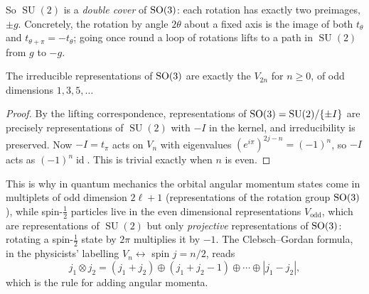 \documentclass[a4paper]{scrartcl}
\newcommand{\SU}{\operatorname{SU}}
\newcommand{\id}{\operatorname{id}}
\begin{document}
So $\SU(2)$ is a \emph{double cover} of $\operatorname{SO}(3)$: each rotation has exactly two preimages, $\pm g$. Concretely, the rotation by angle $2\theta$ about a fixed axis is the image of both $t_\theta$ and $t_{\theta+\pi} = -t_\theta$; going once round a loop of rotations lifts to a path in $\SU(2)$ from $g$ to $-g$.

\begin{center}
\end{center}
\vspace{0.3em}

\begin{corollary}
	The irreducible representations of $\operatorname{SO}(3)$ are exactly the $V_{2n}$ for $n\geq0$, of odd dimensions $1, 3, 5,\dots$
\end{corollary}
\begin{proof}
	By the lifting correspondence, representations of $\SO(3) = \SU(2)/\{\pm I\}$ are precisely representations of $\SU(2)$ with $-I$ in the kernel, and irreducibility is preserved. Now $-I = t_\pi$ acts on $V_n$ with eigenvalues $(e^{i\pi})^{2j-n} = (-1)^n$, so $-I$ acts as $(-1)^n\id$. This is trivial exactly when $n$ is even.
\end{proof}

\begin{remark}
	This is why in quantum mechanics the orbital angular momentum states come in multiplets of odd dimension $2\ell+1$ (representations of the rotation group $\operatorname{SO}(3)$), while spin-$\frac12$ particles live in the even dimensional representations $V_{\text{odd}}$, which are representations of $\SU(2)$ but only \emph{projective} representations of $\operatorname{SO}(3)$: rotating a spin-$\frac12$ state by $2\pi$ multiplies it by $-1$. The Clebsch--Gordan formula, in the physicists' labelling $V_n \leftrightarrow$ spin $j = n/2$, reads
	$$j_1\otimes j_2 = (j_1+j_2)\oplus(j_1+j_2-1)\oplus\cdots\oplus|j_1-j_2|,$$
	which is the rule for adding angular momenta.
\end{remark}
\end{document}
